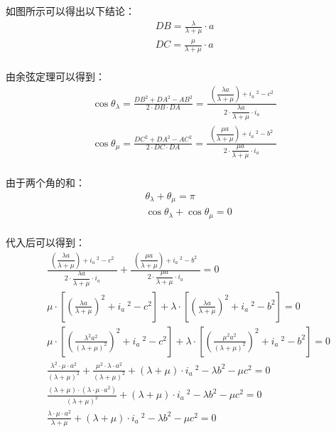 \documentclass[UTF8]{ctexart}
\begin{document}
    如图所示可以得出以下结论：
    \setcounter{equation}{0}
    \begin{align}
        DB=\frac{\lambda}{\lambda+\mu}\cdot a\\[3mm]
        DC=\frac{\mu}{\lambda+\mu}\cdot a
    \end{align}\\
    由余弦定理可以得到：
    \begin{align}
        \cos{\theta_{\lambda}}=\frac{DB^2+DA^2-AB^2}{2\cdot DB\cdot DA}=\frac{~~\left(\dfrac{\lambda a}{\lambda+\mu}\right)+i_a~^2-c^2~~}{2\cdot\dfrac{\lambda a}{\lambda+\mu}\cdot i_a}\\[5mm]
        \cos{\theta_{\mu}}=\frac{DC^2+DA^2-AC^2}{2\cdot DC\cdot DA}=\frac{~~\left(\dfrac{\mu a}{\lambda+\mu}\right)+i_a~^2-b^2~~}{2\cdot\dfrac{\mu a}{\lambda+\mu}\cdot i_a}
    \end{align}\\
    由于两个角的和：
    \begin{align}
        &\theta_{\lambda}+\theta_{\mu}=\pi\\[3mm]
        &\cos{\theta_{\lambda}}+\cos{\theta_{\mu}}=0
    \end{align}\\
    代入后可以得到：\vspace{8pt}
    \begin{align}
        &\frac{~~\left(\dfrac{\lambda a}{\lambda+\mu}\right)+i_a~^2-c^2~~}{2\cdot\dfrac{\lambda a}{\lambda+\mu}\cdot i_a}+\frac{~~\left(\dfrac{\mu a}{\lambda+\mu}\right)+i_a~^2-b^2~~}{2\cdot\dfrac{\mu a}{\lambda+\mu}\cdot i_a}=0\\[3mm]
        &\mu\cdot\left[\left(\frac{\lambda a}{\lambda+\mu}\right)^2+i_a~^2-c^2\right]+\lambda\cdot\left[\left(\frac{\lambda a}{\lambda+\mu}\right)^2+i_a~^2-b^2\right]=0\\[5mm]
        &\mu\cdot\left[\left(\frac{\lambda^2 a^2}{(\lambda+\mu)^2}\right)^2+i_a~^2-c^2\right]+\lambda\cdot\left[\left(\frac{\mu^2 a^2}{(\lambda+\mu)^2}\right)^2+i_a~^2-b^2\right]=0\\[7mm]
        &\frac{\lambda^2\cdot\mu\cdot a^2}{(\lambda+\mu)^2}+\frac{\mu^2\cdot\lambda\cdot a^2}{(\lambda+\mu)^2}+(\lambda+\mu)\cdot i_a~^2-\lambda b^2-\mu c^2=0\\[5mm]
        &\frac{(\lambda+\mu)\cdot\left(\lambda\cdot\mu\cdot a^2\right)}{(\lambda+\mu)^2}+(\lambda+\mu)\cdot i_a~^2-\lambda b^2-\mu c^2=0\\[5mm]
        &\frac{\lambda\cdot\mu\cdot a^2}{\lambda+\mu}+(\lambda+\mu)\cdot i_a~^2-\lambda b^2-\mu c^2=0
    \end{align}
\end{document}
